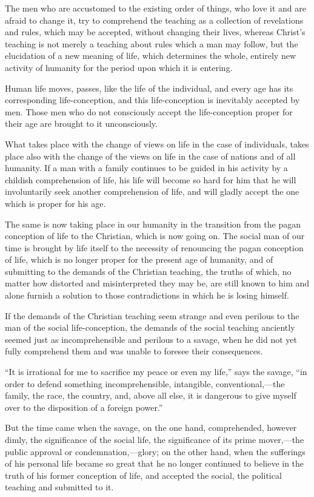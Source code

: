 \documentclass{book}
\begin{document}
The men who are accustomed to the existing order of things, who love it and are afraid to change it, try to comprehend the teaching as a collection of revelations and rules, which may be accepted, without changing their lives, whereas Christ’s teaching is not merely a teaching about rules which a man may follow, but the elucidation of a new meaning of life, which determines the whole, entirely new activity of humanity for the period upon which it is entering.

Human life moves, passes, like the life of the individual, and every age has its corresponding life-conception, and this life-conception is inevitably accepted by men. Those men who do not consciously accept the life-conception proper for their age are brought to it unconsciously.

What takes place with the change of views on life in the case of individuals, takes place also with the change of the views on life in the case of nations and of all humanity. If a man with a family continues to be guided in his activity by a childish comprehension of life, his life will become so hard for him that he will involuntarily seek another comprehension of life, and will gladly accept the one which is proper for his age.

The same is now taking place in our humanity in the transition from the pagan conception of life to the Christian, which is now going on. The social man of our time is brought by life itself to the necessity of renouncing the pagan conception of life, which is no longer proper for the present age of humanity, and of submitting to the demands of the Christian teaching, the truths of which, no matter how distorted and misinterpreted they may be, are still known to him and alone furnish a solution to those contradictions in which he is losing himself.

If the demands of the Christian teaching seem strange and even perilous to the man of the social life-conception, the demands of the social teaching anciently seemed just as incomprehensible and perilous to a savage, when he did not yet fully comprehend them and was unable to foresee their consequences.

“It is irrational for me to sacrifice my peace or even my life,” says the savage, “in order to defend something incomprehensible, intangible, conventional,—the family, the race, the country, and, above all else, it is dangerous to give myself over to the disposition of a foreign power.”

But the time came when the savage, on the one hand, comprehended, however dimly, the significance of the social life, the significance of its prime mover,—the public approval or condemnation,—glory; on the other hand, when the sufferings of his personal life became so great that he no longer continued to believe in the truth of his former conception of life, and accepted the social, the political teaching and submitted to it.
\end{document}
